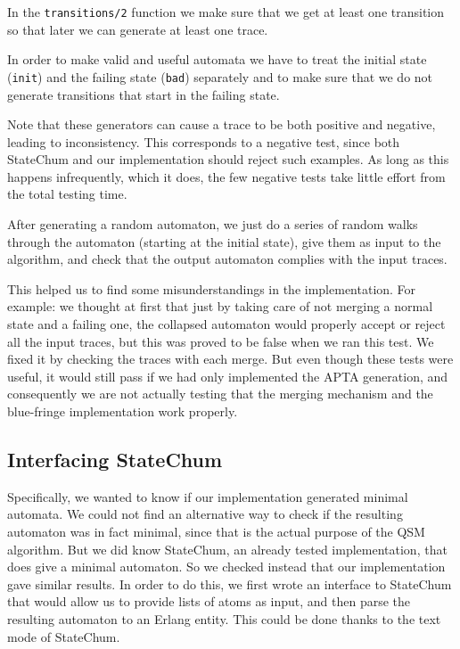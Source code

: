 \documentclass[]{sigplanconf}
\begin{document}
In the \texttt{transitions/2} function we make sure that we get at least one transition
so that later we can generate at least one trace.

In order to make valid and useful automata we  have to treat the
initial state (\texttt{init}) and the failing state (\texttt{bad})
separately and to make sure that we do not generate transitions
that start in the failing state.

Note that these generators can cause a trace to be both positive and negative, leading to inconsistency. This corresponds to a negative test, since both StateChum and our implementation should reject such examples. As long as this happens infrequently, which it does, the few negative tests take little effort from the total testing time.

After generating a random automaton, we just do a series of
random walks through the automaton (starting at the initial state),
give them as input to the algorithm, and check that the output automaton
complies with the input traces.

This helped us to find some misunderstandings in the implementation. For
example: we thought at first  that just by taking care of not
merging a normal state and a failing one, the collapsed automaton would
properly accept or reject all the input traces, but this was proved to
be false when we ran this test. We fixed it by checking the traces with
each merge. But even though these tests were useful, it would still pass
if we had only implemented the APTA generation, and consequently we are
not actually testing that the merging mechanism and the blue-fringe
implementation work properly.

\subsection{Interfacing StateChum}

Specifically, we wanted to know if our implementation generated minimal
automata. We could not find an alternative way to check if the resulting
automaton was in fact minimal, since that is the actual purpose of the
QSM algorithm.
But we did know StateChum, an already tested implementation, that does give
a minimal automaton. So we checked instead that our implementation gave similar
results. In order to do this, we first wrote an interface to StateChum
that would allow us to provide lists of atoms as input, and then parse the
resulting automaton to an Erlang entity. This could be done thanks to the
text mode of StateChum.
\end{document}
